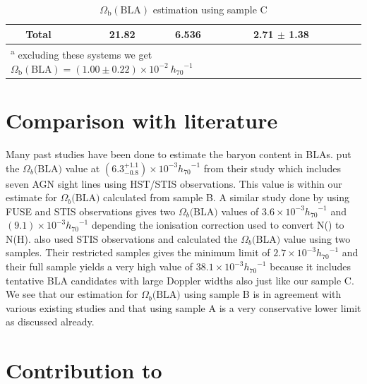 \begin{table}[!h]
\begin{tabular}{ccccccc}
            \hline 
 
            Total &  &  21.82 &  6.536  & 2.71 $\pm$  1.38 \\ 

            \hline \hline 
            \multicolumn{5}{l}{\textsuperscript{a} \footnotesize{excluding these systems we get $\Omega_\text{b}(\text{BLA}) = (1.00 \pm  0.22) \times 10^{-2} \ {h_{70}}^{-1}$}} \\
        \end{tabular}
    \caption{$\Omega_\text{b}(\text{BLA})$ estimation using sample C}
    \label{tab:Omega_b_sampleC}
\end{table}


\section{Comparison with literature}

Many past studies have been done to estimate the baryon content in BLAs. \citet{Danforth_2010} put the $\Omega_b\text{(BLA)}$ value at $(6.3^{+1.1}_{-0.8})\times 10^{-3} {h_{70}}^{-1}$ from their study which includes seven AGN sight lines using HST/STIS observations. This value is within our estimate for $\Omega_b\text{(BLA)}$ calculated from sample B. A similar study done by \citet{Lehner-2007} using FUSE and STIS observations gives two $\Omega_b\text{(BLA)}$ values of $3.6\times 10^{-3} {h_{70}}^{-1}$ and $(9.1)\times 10^{-3} {h_{70}}^{-1}$ depending the ionisation correction used to convert N() to N(H). \citet{Richter-2006} also used STIS observations and calculated the $\Omega_b\text{(BLA)}$ value using two samples. Their restricted samples gives the minimum limit of $2.7\times 10^{-3} {h_{70}}^{-1}$ and their full sample yields a very high value of $38.1\times 10^{-3} {h_{70}}^{-1}$ because it includes tentative BLA candidates with large Doppler widths also just like our sample C. We see that our estimation for $\Omega_b\text{(BLA)}$ using sample B is in agreement with various existing studies and that using sample A is a very conservative lower limit as discussed already.

\section{\texorpdfstring{Contribution to }{Contribution to Omega_b}}

